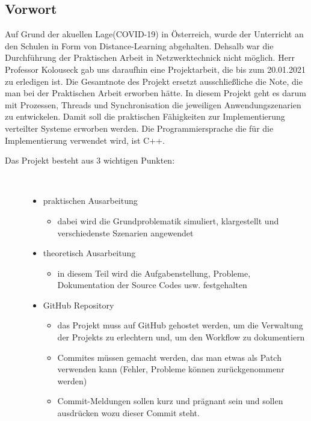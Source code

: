 \documentclass[a4paper,12pt]{article}
\begin{document}
\subsection{Vorwort}

Auf Grund der akuellen Lage(COVID-19) in Österreich, wurde der Unterricht an den Schulen
in Form von Distance-Learning abgehalten. Dehsalb war die Durchführung der Praktischen Arbeit in
Netzwerktechnick nicht möglich. Herr Professor Kolouseck gab uns daraufhin eine Projektarbeit, die bis zum 
20.01.2021 zu erledigen ist. Die Gesamtnote des Projekt ersetzt ausschließliche die Note,
die man bei der Praktischen Arbeit erworben hätte. In diesem Projekt geht es darum mit Prozessen, Threads und Synchronisation die jeweiligen Anwendungszenarien zu entwickelen. Damit soll die praktischen
Fähigkeiten zur Implementierung verteilter Systeme erworben werden. Die Programmiersprache die für
die Implementierung verwendet wird, ist C++.

\begin{description}
    \item[Das Projekt besteht aus 3 wichtigen Punkten:] ~\par
    \begin{itemize}
        \item praktischen Ausarbeitung
        \begin{itemize}
            \item  dabei wird die Grundproblematik simuliert, klargestellt und verschiedenste Szenarien angewendet 
        \end{itemize}
        \item theoretisch Ausarbeitung
        \begin{itemize}
            \item  in diesem Teil wird die Aufgabenstellung, Probleme, Dokumentation der Source Codes usw. festgehalten 
        \end{itemize}
        \item GitHub Repository
        \begin{itemize}
            \item das Projekt muss auf GitHub gehostet werden, um die Verwaltung der Projekts zu erlechtern und, um den Workflow zu dokumentiern 
            \item Commites müssen gemacht werden, das man etwas als Patch verwenden kann (Fehler, Probleme können zurückgenommenr werden)
            \item Commit-Meldungen sollen kurz und prägnant sein und sollen ausdrücken wozu dieser Commit steht.
        \end{itemize}
    \end{itemize} 
\end{description}
\end{document}

